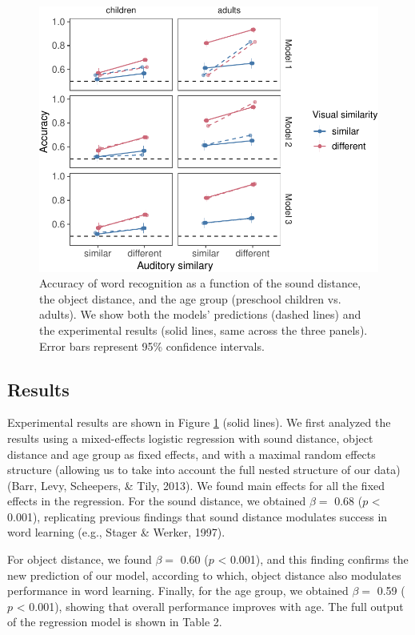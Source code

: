 \documentclass[english,,man]{apa6}
\begin{document}
\begin{figure}[h]

{\centering \includegraphics{ms_blind_files/figure-latex/allData-1} 

}

\caption{Accuracy of word recognition as a function of the sound distance, the object distance, and the age group (preschool children vs. adults). We show both the models' predictions (dashed lines) and the experimental results (solid lines, same across the three panels). Error bars represent 95\% confidence intervals.}\label{fig:allData}
\end{figure}

\hypertarget{results}{%
\subsection{Results}\label{results}}

Experimental results are shown in Figure \ref{fig:allData} (solid lines). We first analyzed the results using a mixed-effects logistic regression with sound distance, object distance and age group as fixed effects, and with a maximal random effects structure (allowing us to take into account the full nested structure of our data) (Barr, Levy, Scheepers, \& Tily, 2013). We found main effects for all the fixed effects in the regression. For the sound distance, we obtained \(\beta =\) 0.68 (\(p\) \textless{} 0.001), replicating previous findings that sound distance modulates success in word learning (e.g., Stager \& Werker, 1997).

For object distance, we found \(\beta =\) 0.60 (\(p\) \textless{} 0.001), and this finding confirms the new prediction of our model, according to which, object distance also modulates performance in word learning. Finally, for the age group, we obtained \(\beta =\) 0.59 (\(p\) \textless{} 0.001), showing that overall performance improves with age. The full output of the regression model is shown in Table 2.
\end{document}

